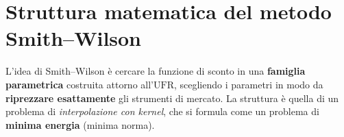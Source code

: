 \documentclass[11pt,a4paper]{article}
\theoremstyle{plain}
\theoremstyle{definition}
\theoremstyle{remark}
\newcommand{\UFR}{\ensuremath{\mathrm{UFR}}}
\begin{document}
\section{Struttura matematica del metodo Smith--Wilson}
\label{sec:sw-metodo}

L'idea di Smith--Wilson \`e cercare la funzione di sconto in una \textbf{famiglia
parametrica} costruita attorno all'$\UFR$, scegliendo i parametri in modo da
\textbf{riprezzare esattamente} gli strumenti di mercato. La struttura \`e quella di un
problema di \emph{interpolazione con kernel}, che si formula come un problema di
\textbf{minima energia} (minima norma).%

\end{document}

